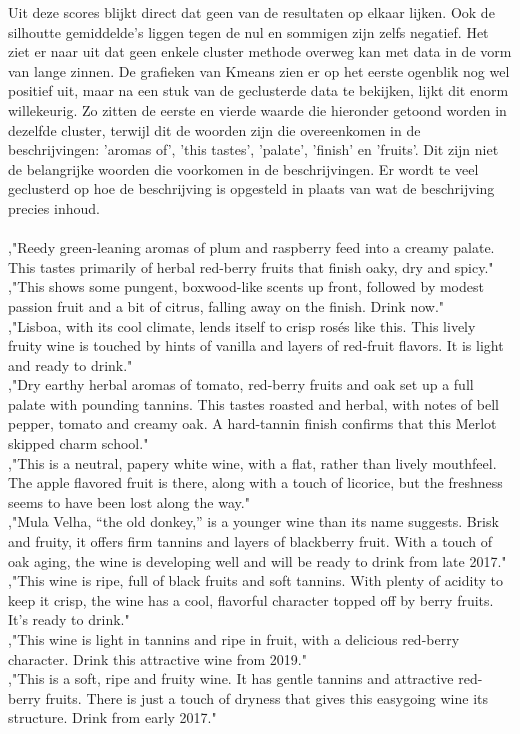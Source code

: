 Uit deze scores blijkt direct dat geen van de resultaten op elkaar lijken. Ook de silhoutte gemiddelde's liggen tegen de nul en sommigen zijn zelfs negatief. Het ziet er naar uit dat geen enkele cluster methode overweg kan met data in de vorm van lange zinnen. De grafieken van Kmeans zien er op het eerste ogenblik nog wel positief uit, maar na een stuk van de geclusterde data te bekijken, lijkt dit enorm willekeurig. Zo zitten de eerste en vierde waarde die hieronder getoond worden in dezelfde cluster, terwijl dit de woorden zijn die overeenkomen in de beschrijvingen: 'aromas of', 'this tastes', 'palate', 'finish' en 'fruits'. Dit zijn niet de belangrijke woorden die voorkomen in de beschrijvingen. Er wordt te veel geclusterd op hoe de beschrijving is opgesteld in plaats van wat de beschrijving precies inhoud.
\\\indent
\\,"Reedy green-leaning aromas of plum and raspberry feed into a creamy palate. This tastes primarily of herbal red-berry fruits that finish oaky, dry and spicy."
\\,"This shows some pungent, boxwood-like scents up front, followed by modest passion fruit and a bit of citrus, falling away on the finish. Drink now."
\\,"Lisboa, with its cool climate, lends itself to crisp rosés like this. This lively fruity wine is touched by hints of vanilla and layers of red-fruit flavors. It is light and ready to drink."
\\,"Dry earthy herbal aromas of tomato, red-berry fruits and oak set up a full palate with pounding tannins. This tastes roasted and herbal, with notes of bell pepper, tomato and creamy oak. A hard-tannin finish confirms that this Merlot skipped charm school."
\\,"This is a neutral, papery white wine, with a flat, rather than lively mouthfeel. The apple flavored fruit is there, along with a touch of licorice, but the freshness seems to have been lost along the way."
\\,"Mula Velha, “the old donkey,” is a younger wine than its name suggests. Brisk and fruity, it offers firm tannins and layers of blackberry fruit. With a touch of oak aging, the wine is developing well and will be ready to drink from late 2017."
\\,"This wine is ripe, full of black fruits and soft tannins. With plenty of acidity to keep it crisp, the wine has a cool, flavorful character topped off by berry fruits. It's ready to drink."
\\,"This wine is light in tannins and ripe in fruit, with a delicious red-berry character. Drink this attractive wine from 2019."
\\,"This is a soft, ripe and fruity wine. It has gentle tannins and attractive red-berry fruits. There is just a touch of dryness that gives this easygoing wine its structure. Drink from early 2017."


